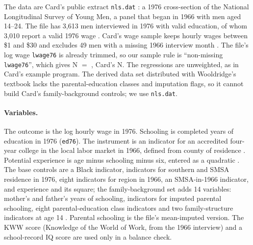 \documentclass[11pt]{article}
\newcommand{\var}[1]{\texttt{#1}}
\begin{document}
The data are Card's public extract \var{nls.dat} \citep{cardproximitydata}: a 1976
cross-section of the National Longitudinal Survey of Young Men, a panel that began in 1966
with men aged 14--24. The file has 3,613 men interviewed in 1976 with valid education, of %
whom 3,010 report a valid 1976 wage \citep[pp.~3--7 and Table~1]{card1993nber}. Card's %
wage sample keeps hourly wages between \$1 and \$30 and excludes 49 men with a missing %
1966 interview month \citep[Table~1 note]{kling2001interpreting}. The file's log wage
\var{lwage76} is already trimmed, so our sample rule is ``non-missing \var{lwage76}'', which
gives N $=$ \NSample{}, Card's N. The regressions are unweighted, as in Card's example
program. The derived data set distributed with Wooldridge's textbook
\citep{wooldridgecarddata} lacks the parental-education classes and imputation flags, so it
cannot build Card's family-background controls; we use \var{nls.dat}.

\paragraph{Variables.} The outcome is the log hourly wage in 1976. Schooling is completed
years of education in 1976 (\var{ed76}). The instrument is an indicator for an accredited
four-year college in the local labor market in 1966, defined from county of residence
\citep[p.~5 and fn.~7]{card1993nber}. Potential experience is age minus schooling minus six,
entered as a quadratic \citep[p.~7]{card1993nber}. The base controls are a Black indicator,
indicators for southern and SMSA residence in 1976, eight indicators for region in 1966, an
SMSA-in-1966 indicator, and experience and its square; the family-background set adds 14
variables: mother's and father's years of schooling, indicators for imputed parental
schooling, eight parental-education class indicators and two family-structure indicators
at age 14 \citep[Tables~2--4 notes]{card1993nber}. Parental schooling is the file's
mean-imputed version. The KWW score (Knowledge of the World of Work, from the 1966
interview) and a school-record IQ score are used only in a balance check.
\end{document}
